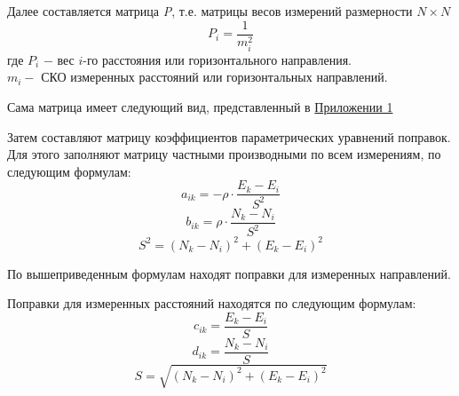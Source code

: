 \documentclass[a4paper]{article}
\begin{document}
\large{Далее составляется матрица \textit{P}, т.е. матрицы весов измерений размерности $N\times N$
\begin{equation}
    P_i=\frac{1}{m_i^2}
\end{equation}
где $P_i$ $-$ вес $\textit{i}$-го расстояния или горизонтального направления.\\
$m_i -$ СКО измеренных расстояний или горизонтальных направлений.
\par Сама матрица имеет следующий вид, представленный в \hyperlink{add_1}{Приложении 1}
\par Затем составляют матрицу коэффициентов параметрических уравнений
поправок. Для этого заполняют матрицу частными производными по всем измерениям, по следующим формулам:
\begin{equation}
    a_{ik} = -\rho\cdot\frac{E_k-E_i}{S^2}
\end{equation}
\begin{equation}
    b_{ik} = \rho\cdot\frac{N_k-N_i}{S^2}
\end{equation}
\begin{equation}
   S^2 = (N_k-N_i)^2+(E_k-E_i)^2
\end{equation}
\par По вышеприведенным формулам находят поправки для измеренных направлений.
\par Поправки для измеренных расстояний находятся по следующим формулам:
\begin{equation}
    c_{ik} = \frac{E_k-E_i}{S}
\end{equation}
\begin{equation}
    d_{ik} = \frac{N_k-N_i}{S}
\end{equation}
\begin{equation}
   S = \sqrt{(N_k-N_i)^2+(E_k-E_i)^2}
\end{equation}}
\end{document}
